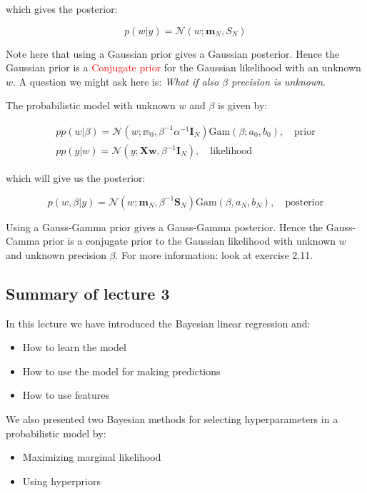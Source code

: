 which gives the posterior:

\begin{equation}
p(w|y)= \mathcal{N}(w;\bm{m}_N,S_N)
\end{equation}

Note here that using a Gaussian prior gives a Gaussian posterior. Hence the Gaussian prior is a \textcolor{red}{Conjugate prior} for the Gaussian likelihood with an unknown $w$. A question we might ask here is: \emph{What if also $\beta$ precision is unknown}.

The probabilistic model with unknown $w$ and $ \beta $ is given by:

\begin{equation}
\begin{aligned}
	pp(w| \beta ) = \mathcal{N}(w; \mathbb{m}_0, \beta ^{-1} \alpha ^{-1} \bm{I}_N) \text{Gam} ( \beta; a_0, b_0), \quad \text{prior} \\
	pp(y|w) = \mathcal{N}(y;\bm{Xw}, \beta ^{-1} \bm{I}_N), \quad \text{likelihood}
\end{aligned}
\end{equation}

which will give us the posterior:

\begin{equation}
	p(w, \beta |y)=\mathcal{N}(w;\bm{m}_N, \beta ^{-1}\bm{S}_N) \text{Gam}( \beta , a_N, b_N), \quad \text{posterior}
\end{equation}

Using a Gauss-Gamma prior gives a Gauss-Gamma posterior. Hence the Gauss-Camma prior is a conjugate prior to the Gaussian likelihood with unknown $w$ and unknown precision $ \beta $. For more information: look at exercise 2.11.

\subsection{Summary of lecture 3}
In this lecture we have introduced the Bayesian linear regression and:
\begin{itemize}
	\item How to learn the model
	\item How to use the model for making predictions
	\item How to use features
\end{itemize}

We also presented two Bayesian methods for selecting hyperparameters in a probabilistic model by:
\begin{itemize}
	\item Maximizing marginal likelihood
	\item Using hyperpriors
\end{itemize}










